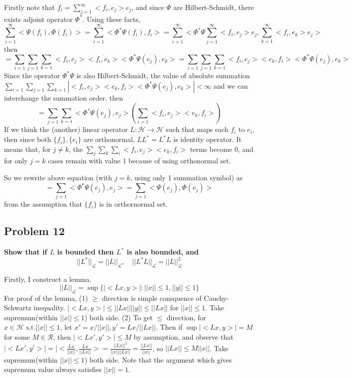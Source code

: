 \documentclass{article}
\begin{document}
Firstly note that $f_i=\sum_{j=1}^\infty<f_i,e_j>e_j$, 
and since $\Phi$ are Hilbert-Schmidt, there exists adjoint operator  $\Phi^*$.
Using these facts,
\[\sum_{i=1}^{\infty} <\Psi(f_i), \Phi(f_i)>
= \sum_{i=1}^{\infty} <\Phi^*\Psi(f_i), f_i> 
= \sum_{i=1}^\infty <\Phi^*\Psi\sum_{j=1}^\infty <f_i,e_j>e_j, \sum_{k=1}^\infty <f_i,e_k>e_j>\]
then
\[=\sum _{i=1}\sum_{j=1}\sum_{k=1}<f_i,e_j>\overline{<f_i,e_k>}<\Phi^*\Psi(e_j),e_k>
=\sum _{i=1}\sum_{j=1}\sum_{k=1}<f_i,e_j><e_k,f_i><\Phi^*\Psi(e_j),e_k>\]
Since the operator $\Phi^*\Psi$ is also Hilbert-Schmidt, the value of absolute summation
\(\sum _{i=1}\sum_{j=1}\sum_{k=1}|<f_i,e_j><e_k,f_i><\Phi^*\Psi(e_j),e_k>|<\infty\)
and we can interchange the summation order. then
\[=\sum_{j=1}\sum_{k=1}<\Phi^*\Psi(e_j),e_j>(\sum_{i=1}<f_i,e_j><e_k,f_i>)\]
If we think the (another) linear operator $L:\mathcal{H}\rightarrow\mathcal{H}$ such that
maps each $f_i$ to $e_i$, then since both $\{f_i\}, \{e_i\}$ are orthonormal, 
$LL^*=L^*L$ is identity operator.
It means that, for $j\neq k$, the \(\sum_j\sum_k\sum_i<f_i,e_j><e_k,f_i>\) terms become 0,
and for only $j=k$ cases remain with value 1 because of using orthonormal set.

So we rewrite above equation (with $j=k$, using only 1 summation symbol) as
\[=\sum_{j=1} <\Phi^*\Psi(e_j),e_j>
=\sum_{j=1} <\Psi(e_j),\Phi(e_j)>\]
from the assumption that $\{f_i\}$ is in orthornormal set.



\newpage
\subsection{Problem 12}
\textbf{
    Show that if $L$ is bounded then $L^*$ is also bounded, and
    \[||L^*||_{\mathcal{L}}=||L||_{\mathcal{L}}, \quad  
    ||L^*L||_{\mathcal{L}}=||L||^2_{\mathcal{L}}
    \]
}

Firstly, I construct a lemma.
\[||L||_{\mathcal{L}} = \sup\{|<Lx,y>|:||x||\leq 1, ||y||\leq 1\}\]
For proof of the lemma, (1) $\geq$ direction is simple consquence of Cauchy-Schwartz inequality.
\(|<Lx,y>|\leq ||Lx||||y|| \leq ||Lx||\) for $||x||\leq 1$. Take supremum(within $||x||\leq 1$) both side.
(2) To get $\leq$ direction, for $x\in \mathcal{H} \text{ s.t.} ||x||\leq 1$,
let $x'=x/||x||, y'=Lx/||Lx||$. Then if $\sup|<Lx,y>|= M$ for some $M\in\mathcal{R}$, then $|<Lx',y'>|\leq M$ by assumption, and observe that
\(|<Lx',y'>|=|<\frac{Lx}{||x||},\frac{Lx}{||Lx||}>=\frac{||Lx||^2}{||x||||Lx||}=\frac{||Lx||}{||x||}\), so
$||Lx||\leq M||x||$. Take supremum(within $||x||\leq 1$) both side. Note that the argument which gives supremum value always satisfies $||x||=1$.
\end{document}
